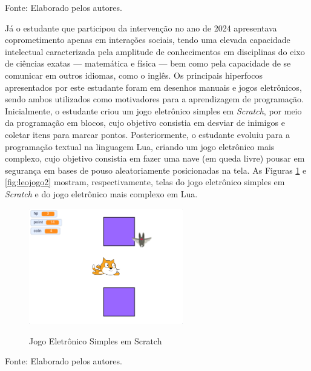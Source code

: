 \documentclass[
  12pt,
  a4paper,
]{article}
\newenvironment{Fonte}
  {\par\begin{center}\begingroup\setstretch{1}\small}
  {\par\endgroup\end{center}}
\begin{document}
\begin{Fonte}

Fonte: Elaborado pelos autores.

\end{Fonte}

Já o estudante que participou da intervenção no ano de 2024 apresentava
coprometimento apenas em interações sociais, tendo uma elevada
capacidade intelectual caracterizada pela amplitude de conhecimentos em
disciplinas do eixo de ciências exatas --- matemática e física --- bem
como pela capacidade de se comunicar em outros idiomas, como o inglês.
Os principais hiperfocos apresentados por este estudante foram em
desenhos manuais e jogos eletrônicos, sendo ambos utilizados como
motivadores para a aprendizagem de programação. Inicialmente, o
estudante criou um jogo eletrônico simples em \emph{Scratch}, por meio
da programação em blocos, cujo objetivo consistia em desviar de inimigos
e coletar itens para marcar pontos. Posteriormente, o estudante evoluiu
para a programação textual na linguagem Lua, criando um jogo eletrônico
mais complexo, cujo objetivo consistia em fazer uma nave (em queda
livre) pousar em segurança em bases de pouso aleatoriamente posicionadas
na tela. As Figuras \ref{fig:leojogo1} e \ref{fig:leojogo2} mostram,
respectivamente, telas do jogo eletrônico simples em \emph{Scratch} e do
jogo eletrônico mais complexo em Lua.

\begin{figure}[H]
  \centering
  \caption{Jogo Eletrônico Simples em Scratch}
  \includegraphics[width=0.6\textwidth]{images/leojogo1.png}
  \label{fig:leojogo1}
\end{figure}

\begin{Fonte}

Fonte: Elaborado pelos autores.

\end{Fonte}
\end{document}
